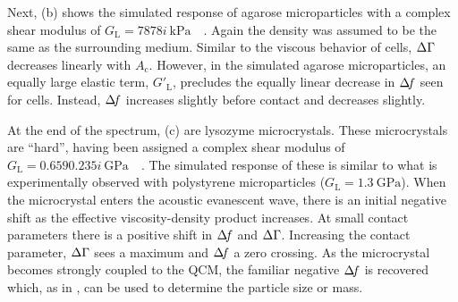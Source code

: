 Next, (b) shows the simulated response of agarose
microparticles with a complex shear modulus of
$G_\mathrm{L}=\SI{78+78i}{\kilo\pascal}$~\cite{yao1999situ}~\cite{dimitriadis2002determination}.
Again the density was assumed to be the same as the surrounding medium.
Similar to the viscous behavior of cells, $\Delta\Gamma$ decreases linearly with
$A_\mathrm{c}$.  However, in the simulated agarose microparticles, an
equally large elastic term, $G'_\mathrm{L}$, precludes the equally linear
decrease in $\Delta\!f$ seen for cells.  Instead, $\Delta\!f$ increases slightly before
contact and decreases slightly.

At the end of the spectrum, (c) are lysozyme
microcrystals.  These microcrystals are ``hard'', having been assigned a
complex shear modulus of
$G_\mathrm{L}=\SI{0.659+0.235i}{\giga\pascal}$~\cite{zamiri2009modeling}~\cite{guo2008investigation}.
The simulated response of these is similar to what is experimentally
observed with polystyrene microparticles
($G_\mathrm{L}=\SI{1.3}{\giga\pascal}$).  When the microcrystal enters the
acoustic evanescent wave, there is an initial negative shift as the
effective viscosity-density product increases.  At small contact parameters
there is a positive shift in $\Delta\!f$ and $\Delta\Gamma$.  Increasing the contact
parameter, $\Delta\Gamma$ sees a maximum and $\Delta\!f$ a zero crossing.  As the
microcrystal becomes strongly coupled to the QCM, the familiar negative
$\Delta\!f$ is recovered which, as in , can be used to
determine the particle size or mass.
